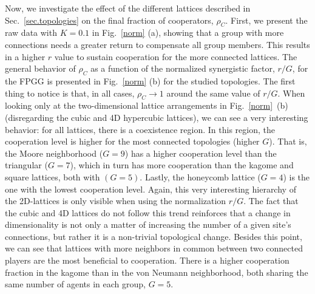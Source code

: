 \documentclass[5p,review]{elsarticle}
\begin{document}
Now, we investigate the effect of the different lattices described in Sec.~\ref{sec.topologies} on the final fraction of cooperators, $\rho_C$. 
%
First, we present the raw data with $K=0.1$ in Fig.~\ref{norm} (a), showing that a group with more connections needs a greater return to compensate all group members. This results in a higher $r$ value to sustain cooperation for the more connected lattices.
%
The general behavior of $\rho_C$ as a function of the normalized synergistic factor, $r/G$, for the FPGG is presented in Fig.~\ref{norm} (b) for the studied topologies.
%
The first thing to notice is that, in all cases, $\rho_C\to 1$ around the same value of $r/G$. 
%
When looking only at the two-dimensional lattice arrangements in Fig.~\ref{norm}~(b) (disregarding the cubic and 4D hypercubic lattices), we can see a very interesting behavior: for all lattices, there is a coexistence region. In this region, the cooperation level is higher for the most connected topologies (higher $G$). That is, the Moore neighborhood ($G=9$) has a higher cooperation level than the triangular ($G=7$), which in turn has more cooperation than the kagome and square lattices, both with $(G=5)$. Lastly, the honeycomb lattice ($G=4$) is the one with the lowest cooperation level. Again, this very interesting hierarchy of the 2D-lattices is only visible when using the normalization $r/G$. 
%
The fact that the cubic and 4D lattices do not follow this trend reinforces that a change in dimensionality is not only a matter of increasing the number of a given site's connections, but rather it is a non-trivial topological change.
%
Besides this point, we can see that lattices with more neighbors in common between two connected players are the most beneficial to cooperation. There is a higher cooperation fraction in the kagome than in the von Neumann neighborhood, both sharing the same number of agents in each group, $G=5$. 
\end{document}
